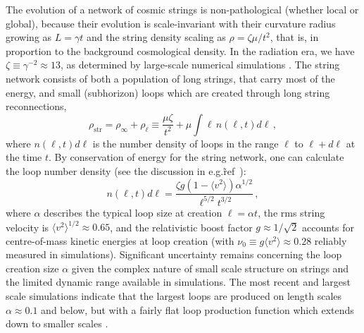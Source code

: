 \documentclass[preprint,nofootinbib]{revtex4}
\begin{document}
The evolution of a network of cosmic strings is non-pathological (whether local or global), because their evolution is scale-invariant  with their curvature radius growing as $L = \gamma t$ and the string density scaling as $\rho = \zeta \mu/t^{2}$, that is, in proportion to the background cosmological density. In the radiation era, we have $\zeta \equiv \gamma^{-2} \approx 13$, as determined by large-scale numerical simulations \cite{bennett:bouchet:axion:string:1,allen:shellard:axion:string}. The string network consists of both a population of long strings, that carry most of the energy, and small (subhorizon) loops which are created through long string reconnections,
\begin{equation}
 \rho_\mathrm{str} = \rho_\infty + \rho_\ell \equiv \frac{\mu \zeta}{t^2} + \mu\int \ell \,n(\ell, t)d\ell\,,
\end{equation}
where $n(\ell, t)d\ell$ is the number density of loops in the range $\ell$ to $\ell +d\ell$ at the time $t$.
By conservation of energy for the string network, one can calculate the loop number density (see the discussion in e.g.\~ref~\cite{vilenkin:shellard:defects}):
\begin{equation}
n(\ell, t ) d\ell =\frac{ \zeta g (1-\langle v^2\rangle)\alpha ^{1/2} }{\ell^{5/2}t^{3/2}}\,,\label{eq:loopdist}
\end{equation}
where $\alpha$ describes the typical loop size at creation $\ell = \alpha t$, the rms string velocity is $\langle v^2\rangle^{1/2}\approx 0.65$, and the relativistic boost factor $g\approx 1/\sqrt{2}$ accounts for centre-of-mass kinetic energies at loop creation (with $\nu_0\equiv g\langle v^2\rangle\approx 0.28$ reliably measured in simulations). Significant uncertainty remains concerning the loop creation size $\alpha$ given the complex nature of small scale structure on strings and the limited dynamic range available in simulations. The most recent and largest scale simulations indicate that the largest loops are produced on length scales  $\alpha \approx 0.1$ and below, but with a fairly flat loop production function which extends down to smaller scales \cite{Olum:2006ix}.
 
\end{document}
